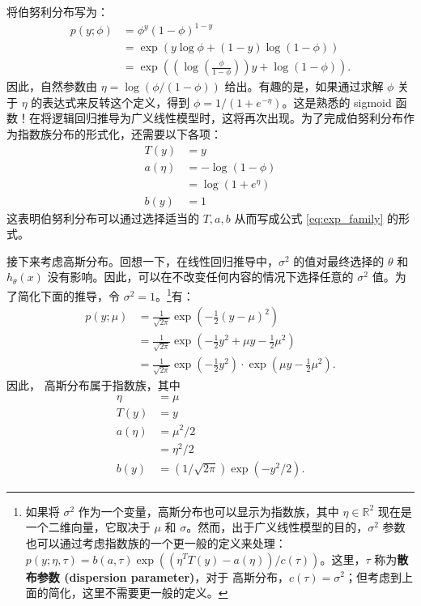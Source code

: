 将伯努利分布写为：
\[
\begin{aligned}
    p(y; \phi) &= \phi^y (1-\phi)^{1-y} \\
    &= \exp\left(y \log \phi + (1-y) \log(1-\phi)\right) \\
    &= \exp\left(\left(\log\left(\frac{\phi}{1-\phi}\right)\right)y + \log(1-\phi)\right).
\end{aligned}
\]
因此，自然参数由 $\eta = \log(\phi/(1-\phi))$ 给出。有趣的是，如果通过求解 $\phi$ 关于 $\eta$ 的表达式来反转这个定义，得到 $\phi = 1/(1+e^{-\eta})$。这是熟悉的 sigmoid 函数！在将逻辑回归推导为广义线性模型时，这将再次出现。为了完成伯努利分布作为指数族分布的形式化，还需要以下各项：
\[
\begin{aligned}
    T(y) &= y \\
    a(\eta) &= -\log(1-\phi) \\
    &= \log(1+e^\eta) \\
    b(y) &= 1
\end{aligned}
\]
这表明伯努利分布可以通过选择适当的 $T, a, b$ 从而写成公式 \eqref{eq:exp_family} 的形式。

接下来考虑高斯分布。回想一下，在线性回归推导中，$\sigma^2$ 的值对最终选择的 $\theta$ 和 $h_\theta(x)$ 没有影响。因此，可以在不改变任何内容的情况下选择任意的 $\sigma^2$ 值。为了简化下面的推导，令 $\sigma^2 = 1$。\footnote{如果将 $\sigma^2$ 作为一个变量，高斯分布也可以显示为指数族，其中 $\eta \in \mathbb{R}^2$ 现在是一个二维向量，它取决于 $\mu$ 和 $\sigma$。然而，出于广义线性模型的目的，$\sigma^2$ 参数也可以通过考虑指数族的一个更一般的定义来处理：$p(y; \eta, \tau) = b(a, \tau) \exp((\eta^T T(y) - a(\eta))/c(\tau))$。这里，$\tau$ 称为\textbf{散布参数 (dispersion parameter)}，对于 高斯分布，$c(\tau) = \sigma^2$；但考虑到上面的简化，这里不需要更一般的定义。}有：
\[
\begin{aligned}
    p(y; \mu) &= \frac{1}{\sqrt{2\pi}} \exp\left(-\frac{1}{2}(y-\mu)^2\right) \\
    &= \frac{1}{\sqrt{2\pi}} \exp\left(-\frac{1}{2}y^2 + \mu y - \frac{1}{2}\mu^2\right) \\
    &= \frac{1}{\sqrt{2\pi}} \exp\left(-\frac{1}{2}y^2\right) \cdot \exp\left(\mu y - \frac{1}{2}\mu^2\right).
\end{aligned}
\]
因此， 高斯分布属于指数族，其中
\[
\begin{aligned}
    \eta &= \mu \\
    T(y) &= y \\
    a(\eta) &= \mu^2/2 \\
    &= \eta^2/2 \\
    b(y) &= (1/\sqrt{2\pi})\exp(-y^2/2).
\end{aligned}
\]

